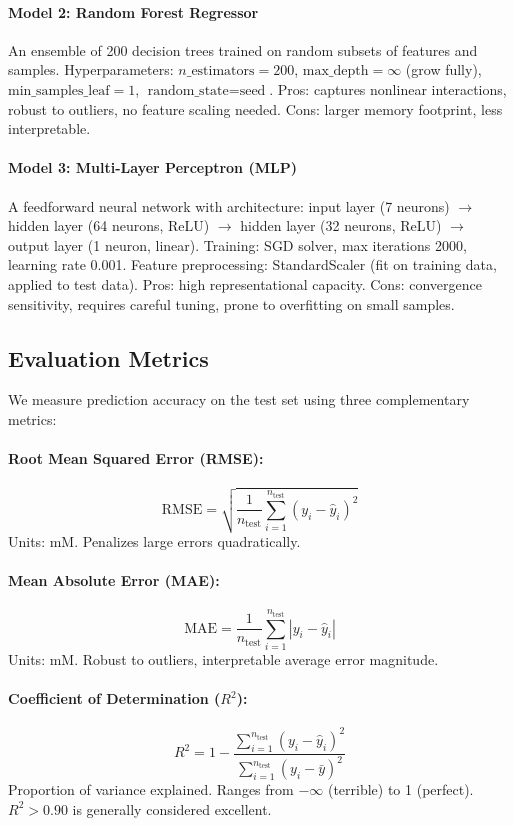 \documentclass[conference]{IEEEtran}
\begin{document}
\paragraph{Model 2: Random Forest Regressor}
An ensemble of 200 decision trees trained on random subsets of features and samples. Hyperparameters: $n\_\text{estimators}=200$, $\text{max\_depth}=\infty$ (grow fully), $\text{min\_samples\_leaf}=1$, $\text{random\_state}=\text{seed}$. Pros: captures nonlinear interactions, robust to outliers, no feature scaling needed. Cons: larger memory footprint, less interpretable.

\paragraph{Model 3: Multi-Layer Perceptron (MLP)}
A feedforward neural network with architecture: input layer (7 neurons) $\to$ hidden layer (64 neurons, ReLU) $\to$ hidden layer (32 neurons, ReLU) $\to$ output layer (1 neuron, linear). Training: SGD solver, max iterations 2000, learning rate 0.001. Feature preprocessing: StandardScaler (fit on training data, applied to test data). Pros: high representational capacity. Cons: convergence sensitivity, requires careful tuning, prone to overfitting on small samples.

\subsection{Evaluation Metrics}
We measure prediction accuracy on the test set using three complementary metrics:

\paragraph{Root Mean Squared Error (RMSE):}
\[
\text{RMSE} = \sqrt{\frac{1}{n_{\text{test}}}\sum_{i=1}^{n_{\text{test}}}(y_i - \hat{y}_i)^2}
\]
Units: mM. Penalizes large errors quadratically.

\paragraph{Mean Absolute Error (MAE):}
\[
\text{MAE} = \frac{1}{n_{\text{test}}}\sum_{i=1}^{n_{\text{test}}}|y_i - \hat{y}_i|
\]
Units: mM. Robust to outliers, interpretable average error magnitude.

\paragraph{Coefficient of Determination ($R^2$):}
\[
R^2 = 1 - \frac{\sum_{i=1}^{n_{\text{test}}}(y_i - \hat{y}_i)^2}{\sum_{i=1}^{n_{\text{test}}}(y_i - \bar{y})^2}
\]
Proportion of variance explained. Ranges from $-\infty$ (terrible) to 1 (perfect). $R^2 > 0.90$ is generally considered excellent.
\end{document}
